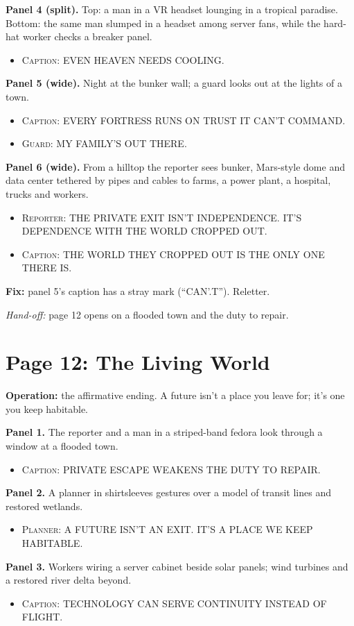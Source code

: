 \documentclass[11pt]{article}
\newcommand{\op}[1]{\textbf{Operation:} #1\par}
\newcommand{\panel}[2]{\textbf{#1.} #2\par}
\newenvironment{lines}{\begin{itemize}[label={},leftmargin=1.5em,itemsep=0.05em,topsep=0.1em]}{\end{itemize}}
\newcommand{\say}[2]{\item \textsc{#1}: \textsf{\small #2}}
\newcommand{\fix}[1]{\textcolor{tractred}{\textbf{Fix:}} #1\par}
\newcommand{\handoff}[1]{\emph{Hand-off:} #1\par}
\begin{document}
\panel{Panel 4 (split)}{Top: a man in a VR headset lounging in a tropical paradise. Bottom: the same man slumped in a headset among server fans, while the hard-hat worker checks a breaker panel.}
\begin{lines}\say{Caption}{EVEN HEAVEN NEEDS COOLING.}\end{lines}

\panel{Panel 5 (wide)}{Night at the bunker wall; a guard looks out at the lights of a town.}
\begin{lines}\say{Caption}{EVERY FORTRESS RUNS ON TRUST IT CAN'T COMMAND.}\say{Guard}{MY FAMILY'S OUT THERE.}\end{lines}

\panel{Panel 6 (wide)}{From a hilltop the reporter sees bunker, Mars-style dome and data center tethered by pipes and cables to farms, a power plant, a hospital, trucks and workers.}
\begin{lines}\say{Reporter}{THE PRIVATE EXIT ISN'T INDEPENDENCE. IT'S DEPENDENCE WITH THE WORLD CROPPED OUT.}\say{Caption}{THE WORLD THEY CROPPED OUT IS THE ONLY ONE THERE IS.}\end{lines}

\fix{panel 5's caption has a stray mark (``CAN'.T''). Reletter.}
\handoff{page 12 opens on a flooded town and the duty to repair.}

\section{Page 12: The Living World}

\op{the affirmative ending. A future isn't a place you leave for; it's one you keep habitable.}

\panel{Panel 1}{The reporter and a man in a striped-band fedora look through a window at a flooded town.}
\begin{lines}\say{Caption}{PRIVATE ESCAPE WEAKENS THE DUTY TO REPAIR.}\end{lines}

\panel{Panel 2}{A planner in shirtsleeves gestures over a model of transit lines and restored wetlands.}
\begin{lines}\say{Planner}{A FUTURE ISN'T AN EXIT. IT'S A PLACE WE KEEP HABITABLE.}\end{lines}

\panel{Panel 3}{Workers wiring a server cabinet beside solar panels; wind turbines and a restored river delta beyond.}
\begin{lines}\say{Caption}{TECHNOLOGY CAN SERVE CONTINUITY INSTEAD OF FLIGHT.}\end{lines}
\end{document}
